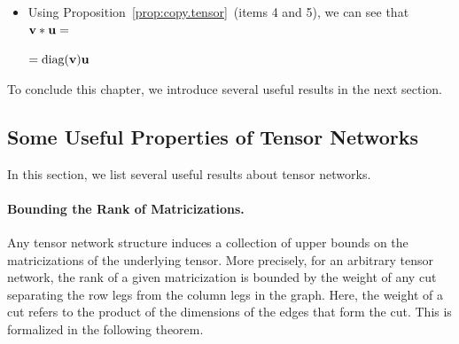 \begin{remark}
\begin{itemize}
    \item Using Proposition~\ref{prop:copy.tensor}~(items 4 and 5), we can see that 
    $\mathbf{v}*\mathbf{u}=$
    $=\text{diag}(\mathbf{v})\mathbf{u}$
\end{itemize}
\end{remark}
To conclude this chapter, we introduce several useful results in the next section.

\subsection{Some Useful Properties of Tensor Networks}\label{sec:useful-TNs}
In this section, we list several useful results about tensor networks. 

\paragraph{Bounding the Rank of Matricizations.}
Any tensor network structure induces a collection of upper bounds on the matricizations of the underlying tensor. More precisely, for an arbitrary tensor network, the rank of a given matricization is bounded by the weight of any cut separating the row legs from the column legs in the graph. Here, the weight of a cut refers to the product of the dimensions of the edges that form the cut. This is formalized in the following theorem. 

